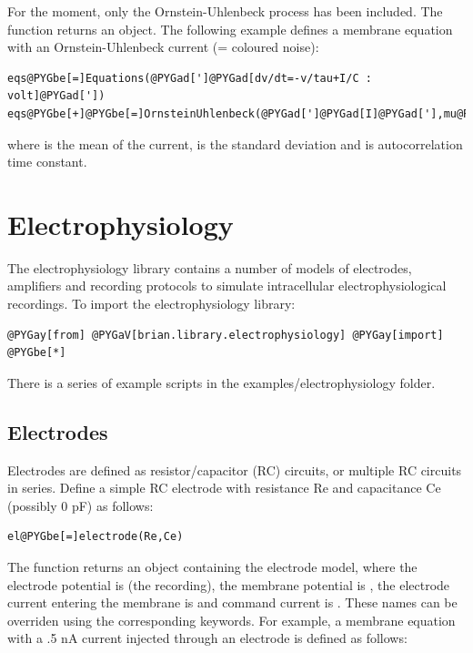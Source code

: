 \documentclass[letterpaper,10pt,english]{manual}
\begin{document}
For the moment, only the Ornstein-Uhlenbeck process has been included.
The function  returns an \hyperlink{brian.Equations}{} object. The following example
defines a membrane equation with an Ornstein-Uhlenbeck current  (= coloured noise):

\begin{Verbatim}[commandchars=@\[\]]
eqs@PYGbe[=]Equations(@PYGad[']@PYGad[dv/dt=-v/tau+I/C : volt]@PYGad['])
eqs@PYGbe[+]@PYGbe[=]OrnsteinUhlenbeck(@PYGad[']@PYGad[I]@PYGad['],mu@PYGbe[=]@PYGaw[1]@PYGbe[*]nA,sigma@PYGbe[=]@PYGaw[2]@PYGbe[*]nA,tau@PYGbe[=]@PYGaw[10]@PYGbe[*]ms)
\end{Verbatim}

where  is the mean of the current,  is the standard deviation and
 is autocorrelation time constant.

\resetcurrentobjects


\section{Electrophysiology}

The electrophysiology library contains a number of models of electrodes,
amplifiers and recording protocols to simulate intracellular electrophysiological
recordings.
To import the electrophysiology library:

\begin{Verbatim}[commandchars=@\[\]]
@PYGay[from] @PYGaV[brian.library.electrophysiology] @PYGay[import] @PYGbe[*]
\end{Verbatim}

There is a series of example scripts in the examples/electrophysiology folder.


\subsection{Electrodes}

Electrodes are defined as resistor/capacitor (RC) circuits, or multiple
RC circuits in series. Define a simple RC electrode with resistance Re
and capacitance Ce (possibly 0 pF) as follows:

\begin{Verbatim}[commandchars=@\[\]]
el@PYGbe[=]electrode(Re,Ce)
\end{Verbatim}

The  function returns an \hyperlink{brian.Equations}{} object containing the
electrode model, where
the electrode potential is  (the recording), the membrane potential is , the electrode current
entering the membrane is  and command current is .
These names can be overriden using the corresponding keywords. For example, a membrane
equation with a .5 nA current injected through an electrode is defined as follows:
\end{document}
